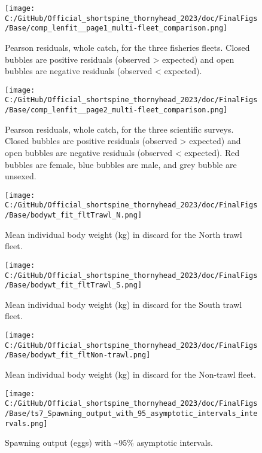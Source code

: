 \documentclass[11pt,
  english,
  letterpaper,
]{article}
\begin{document}
\begin{figure}
\centering
\texttt{[image: C:/GitHub/Official\_shortspine\_thornyhead\_2023/doc/FinalFigs/Base/comp\_lenfit\_\_page1\_multi-fleet\_comparison.png]}
\caption{Pearson residuals, whole catch, for the three fisheries fleets. Closed bubbles are positive residuals (observed \textgreater{} expected) and open bubbles are negative residuals (observed \textless{} expected).\label{fig:resids_fisheries}}
\end{figure}

\begin{figure}
\centering
\texttt{[image: C:/GitHub/Official\_shortspine\_thornyhead\_2023/doc/FinalFigs/Base/comp\_lenfit\_\_page2\_multi-fleet\_comparison.png]}
\caption{Pearson residuals, whole catch, for the three scientific surveys. Closed bubbles are positive residuals (observed \textgreater{} expected) and open bubbles are negative residuals (observed \textless{} expected). Red bubbles are female, blue bubbles are male, and grey bubble are unsexed.\label{fig:resids_survey}}
\end{figure}

\begin{figure}
\centering
\texttt{[image: C:/GitHub/Official\_shortspine\_thornyhead\_2023/doc/FinalFigs/Base/bodywt\_fit\_fltTrawl\_N.png]}
\caption{Mean individual body weight (kg) in discard for the North trawl fleet.\label{fig:weightNorthTrl}}
\end{figure}

\begin{figure}
\centering
\texttt{[image: C:/GitHub/Official\_shortspine\_thornyhead\_2023/doc/FinalFigs/Base/bodywt\_fit\_fltTrawl\_S.png]}
\caption{Mean individual body weight (kg) in discard for the South trawl fleet.\label{fig:weightSouthTrl}}
\end{figure}

\begin{figure}
\centering
\texttt{[image: C:/GitHub/Official\_shortspine\_thornyhead\_2023/doc/FinalFigs/Base/bodywt\_fit\_fltNon-trawl.png]}
\caption{Mean individual body weight (kg) in discard for the Non-trawl fleet.\label{fig:weightNonTrl}}
\end{figure}

\begin{figure}
\centering
\texttt{[image: C:/GitHub/Official\_shortspine\_thornyhead\_2023/doc/FinalFigs/Base/ts7\_Spawning\_output\_with\_95\_asymptotic\_intervals\_intervals.png]}
\caption{Spawning output (eggs) with \textasciitilde95\% asymptotic intervals.\label{fig:spawnout}}
\end{figure}
\end{document}
